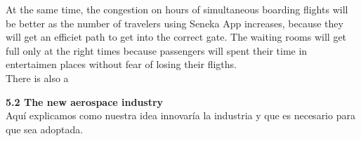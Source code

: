 \documentclass[]{article}
\begin{document}
At the same time, the congestion on hours of simultaneous boarding flights will be better as the number of travelers using Seneka App increases, because they will get an efficiet path to get into the correct gate. The waiting rooms will get full only at the right times because passengers will spent their time in entertaimen places without fear of losing their fligths.\\

There is also a 

\Large{\textbf{5.2 The new aerospace industry}\\}
Aquí explicamos como nuestra idea innovaría la industria y que es necesario para que sea adoptada.
\end{document}
